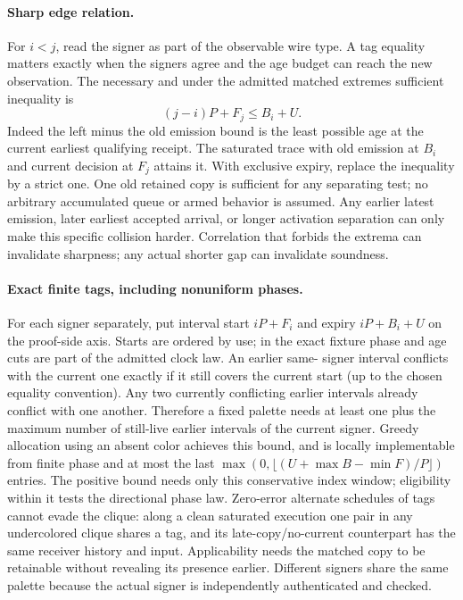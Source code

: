 \documentclass[11pt]{article}
\begin{document}
\paragraph{Sharp edge relation.}
For \(i<j\), read the signer as part of the observable
wire type. A tag equality matters exactly when the signers
agree and the age budget can reach the new observation.
The necessary and under the admitted matched extremes
sufficient inequality is
\[
       (j-i)P+F_j\le B_i+U .
\]
Indeed the left minus the old emission bound is the least
possible age at the current earliest qualifying receipt.
The saturated trace with old emission at \(B_i\) and
current decision at \(F_j\) attains it. With exclusive
expiry, replace the inequality by a strict one. One old
retained copy is sufficient for any separating test; no
arbitrary accumulated queue or armed behavior is assumed.
Any earlier latest emission, later earliest accepted arrival, or
longer activation separation can only make this specific
collision harder. Correlation that forbids the extrema
can invalidate sharpness; any actual shorter gap can
invalidate soundness.

\paragraph{Exact finite tags, including nonuniform phases.}
For each signer separately, put interval start \(iP+F_i\)
and expiry \(iP+B_i+U\) on the proof-side axis. Starts
are ordered by use; in the exact fixture phase and age
cuts are part of the admitted clock law. An earlier same-
signer interval conflicts with the current one exactly
if it still covers the current start (up to the chosen
equality convention). Any two currently conflicting
earlier intervals already conflict with one another.
Therefore a fixed palette needs at least one plus the
maximum number of still-live earlier intervals of the
current signer. Greedy allocation using an absent color
achieves this bound, and is locally implementable from
finite phase and at most the last
\(\max(0,\lfloor(U+\max B-\min F)/P\rfloor)\) entries.
The positive bound needs only this conservative index
window; eligibility within it tests the directional
phase law. Zero-error alternate schedules of tags cannot
evade the clique: along a clean saturated execution one
pair in any undercolored clique shares a tag, and its
late-copy/no-current counterpart has the same receiver
history and input. Applicability needs the matched
copy to be retainable without revealing its presence earlier.
Different signers share the same palette because the
actual signer is independently authenticated and checked.
\end{document}
